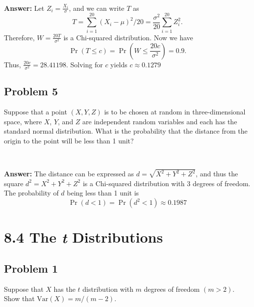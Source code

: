 \documentclass{article}
\begin{document}
\

\textbf{Answer:} Let $Z_i = \frac{X_i}{\sigma}$, and we can write $T$ as
\begin{equation*}
T = \sum_{i=1}^{20} (X_i - \mu)^2/20 = \frac{\sigma^2}{20} \sum_{i=1}^{20} Z_i^2.
\end{equation*}
Therefore, $W = \frac{20T}{\sigma^2}$ is a Chi-squared distribution. Now we have
\begin{equation*}
\Pr(T \le c) = \Pr(W \le \frac{20c}{\sigma^2}) = 0.9.
\end{equation*}
Thus, $\frac{20c}{\sigma^2} = 28.41198$. Solving for $c$ yields $c \approx 0.1279$

\bigskip

\subsection*{Problem 5}
Suppose that a point $(X, Y, Z)$ is to be chosen at random in three-dimensional space, where $X$, $Y$, and $Z$ are independent random variables and each has the standard normal distribution. What is the probability that the distance from the origin to the point will be less than 1 unit?

\

\textbf{Answer:} The distance can be expressed as $d = \sqrt{X^2 + Y^2 + Z^2}$, and thus the square $d^2 = X^2 + Y^2 + Z^2$ is a Chi-squared distribution with 3 degrees of freedom. The probability of $d$ being less than 1 unit is
\begin{equation*}
\Pr(d < 1) = \Pr(d^2 < 1) \approx 0.1987
\end{equation*}


\newpage

\section*{8.4 The \textit{t} Distributions}
\subsection*{Problem 1}
Suppose that $X$ has the $t$ distribution with $m$ degrees of freedom $(m > 2)$. Show that $\text{Var}(X) = m/(m - 2)$.

\
\end{document}
